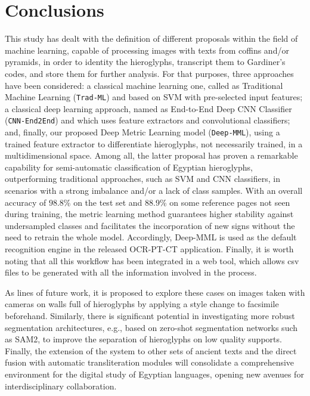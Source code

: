 \documentclass[10pt,onecolumn,letterpaper]{article}
\newcommand{\method}[1]{\texttt{#1}}
\begin{document}
\section{Conclusions}
\label{sec7}

This study has dealt with the definition of different proposals within the field of machine learning, capable of processing images with texts from coffins and/or pyramids, in order to identity the hieroglyphs, transcript them to Gardiner’s codes, and store them for further analysis. For that purposes, three approaches have been considered: a classical machine learning one, called as Traditional Machine Learning (\method{Trad-ML}) and based on SVM with pre-selected input features; a classical deep learning approach, named as End-to-End Deep CNN Classifier (\method{CNN-End2End}) and which uses feature extractors and convolutional classifiers; and, finally, our proposed Deep Metric Learning model (\method{Deep-MML}), using a trained feature extractor to differentiate hieroglyphs, not necessarily trained, in a multidimensional space. Among all, the latter proposal has proven a remarkable capability for semi-automatic classification of Egyptian hieroglyphs, outperforming traditional approaches, such as SVM and CNN classifiers, in scenarios with a strong imbalance and/or a lack of class samples. With an overall accuracy of $98.8$\% on the test set and $88.9$\% on some reference pages not seen during training, the metric learning method guarantees higher stability against undersampled classes and facilitates the incorporation of new signs without the need to retrain the whole model. Accordingly, Deep-MML is used as the default recognition engine in the released OCR-PT-CT application. Finally, it is worth noting that all this workflow has been integrated in a web tool, which allows csv files to be generated with all the information involved in the process.

As lines of future work, it is proposed to explore these cases on images taken with cameras on walls full of hieroglyphs by applying a style change to facsimile beforehand. Similarly, there is significant potential in investigating more robust segmentation architectures, e.g., based on zero-shot segmentation networks such as SAM2\cite{ravi2025sam}, to improve the separation of hieroglyphs on low quality supports. Finally, the extension of the system to other sets of ancient texts and the direct fusion with automatic transliteration modules will consolidate a comprehensive environment for the digital study of Egyptian languages, opening new avenues for interdisciplinary collaboration.
\end{document}
